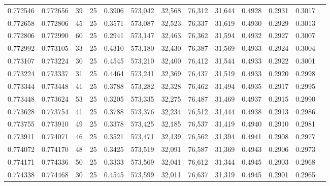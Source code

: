 \begin{tabular}{rrrrrrrrrrrrr}
0.772546 & 0.772656 &    39 &  25 &                                     0.3906 & 573,042 &  32,568 &  76,312 &  31,644 & 0.4928 & 0.2931 & 0.3017 \\
0.772658 & 0.772806 &    45 &  25 &                                     0.3571 & 573,087 &  32,523 &  76,337 &  31,619 & 0.4930 & 0.2929 & 0.3013 \\
0.772806 & 0.772990 &    60 &  25 &                                     0.2941 & 573,147 &  32,463 &  76,362 &  31,594 & 0.4932 & 0.2927 & 0.3007 \\
0.772992 & 0.773105 &    33 &  25 &                                     0.4310 & 573,180 &  32,430 &  76,387 &  31,569 & 0.4933 & 0.2924 & 0.3004 \\
0.773107 & 0.773224 &    30 &  25 &                                     0.4545 & 573,210 &  32,400 &  76,412 &  31,544 & 0.4933 & 0.2922 & 0.3001 \\
0.773224 & 0.773337 &    31 &  25 &                                     0.4464 & 573,241 &  32,369 &  76,437 &  31,519 & 0.4933 & 0.2920 & 0.2998 \\
0.773344 & 0.773448 &    41 &  25 &                                     0.3788 & 573,282 &  32,328 &  76,462 &  31,494 & 0.4935 & 0.2917 & 0.2995 \\
0.773448 & 0.773624 &    53 &  25 &                                     0.3205 & 573,335 &  32,275 &  76,487 &  31,469 & 0.4937 & 0.2915 & 0.2990 \\
0.773628 & 0.773754 &    41 &  25 &                                     0.3788 & 573,376 &  32,234 &  76,512 &  31,444 & 0.4938 & 0.2913 & 0.2986 \\
0.773755 & 0.773910 &    49 &  25 &                                     0.3378 & 573,425 &  32,185 &  76,537 &  31,419 & 0.4940 & 0.2910 & 0.2981 \\
0.773911 & 0.774071 &    46 &  25 &                                     0.3521 & 573,471 &  32,139 &  76,562 &  31,394 & 0.4941 & 0.2908 & 0.2977 \\
0.774072 & 0.774170 &    48 &  25 &                                     0.3425 & 573,519 &  32,091 &  76,587 &  31,369 & 0.4943 & 0.2906 & 0.2973 \\
0.774171 & 0.774336 &    50 &  25 &                                     0.3333 & 573,569 &  32,041 &  76,612 &  31,344 & 0.4945 & 0.2903 & 0.2968 \\
0.774338 & 0.774468 &    30 &  25 &                                     0.4545 & 573,599 &  32,011 &  76,637 &  31,319 & 0.4945 & 0.2901 & 0.2965 \\

\end{tabular}
